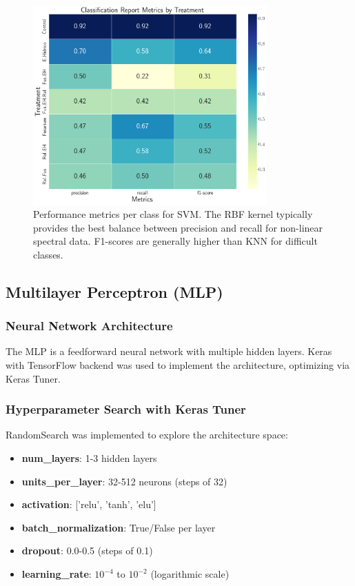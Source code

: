 \documentclass[12pt,a4paper]{article}
\begin{document}
\begin{figure}[H]
    \centering
    \includegraphics[width=0.8\textwidth]{Plots/SVM_Metrics_Report.png}
    \caption{Performance metrics per class for SVM. The RBF kernel typically provides the best balance between precision and recall for non-linear spectral data. F1-scores are generally higher than KNN for difficult classes.}
    \label{fig:svm_report}
\end{figure}

\subsection{Multilayer Perceptron (MLP)}

\subsubsection{Neural Network Architecture}

The MLP is a feedforward neural network with multiple hidden layers. Keras with TensorFlow backend was used to implement the architecture, optimizing via Keras Tuner.

\subsubsection{Hyperparameter Search with Keras Tuner}

RandomSearch was implemented to explore the architecture space:

\begin{itemize}
    \item \textbf{num\_layers}: 1-3 hidden layers
    \item \textbf{units\_per\_layer}: 32-512 neurons (steps of 32)
    \item \textbf{activation}: ['relu', 'tanh', 'elu']
    \item \textbf{batch\_normalization}: True/False per layer
    \item \textbf{dropout}: 0.0-0.5 (steps of 0.1)
    \item \textbf{learning\_rate}: $10^{-4}$ to $10^{-2}$ (logarithmic scale)
\end{itemize}
\end{document}
